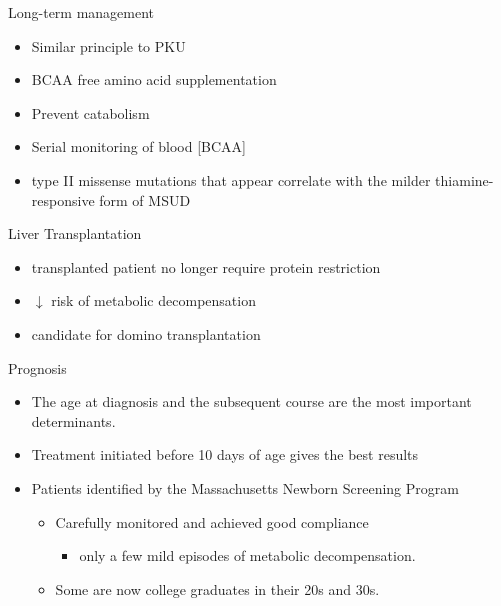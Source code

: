 \documentclass[presentation, smaller]{beamer}
\begin{document}
\begin{frame}[label={sec:orgheadline17}]{Long-term management}
\begin{itemize}
\item Similar principle to PKU
\item BCAA free amino acid supplementation
\item Prevent catabolism
\item Serial monitoring of blood [BCAA]

\item type II missense mutations that appear correlate with the milder
thiamine-responsive form of MSUD
\end{itemize}


\begin{block}{Liver Transplantation}
\begin{itemize}
\item transplanted patient no longer require protein restriction
\item \(\downarrow\) risk of metabolic decompensation
\item candidate for domino transplantation
\end{itemize}
\end{block}
\end{frame}

\begin{frame}[label={sec:orgheadline18}]{Prognosis}
\begin{itemize}
\item The age at diagnosis and the subsequent course are the most
important determinants.
\item Treatment initiated before 10 days of age gives the best results
\item Patients identified by the Massachusetts Newborn Screening Program
\begin{itemize}
\item Carefully monitored and achieved good compliance
\begin{itemize}
\item only a few mild episodes of metabolic decompensation.
\end{itemize}
\item Some are now college graduates in their 20s and 30s.
\end{itemize}
\end{itemize}
\end{frame}
\end{document}
